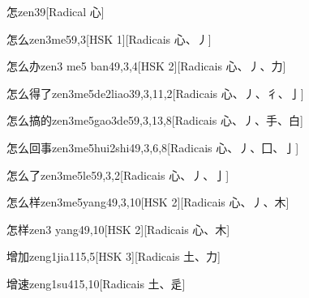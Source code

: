 \begin{entry}{怎}{zen3}{9}[Radical ⼼]
\end{entry}

\begin{entry}{怎么}{zen3me5}{9,3}[HSK 1][Radicais ⼼、⼃]
\end{entry}

\begin{entry}{怎么办}{zen3 me5 ban4}{9,3,4}[HSK 2][Radicais ⼼、⼃、⼒]
\end{entry}

\begin{entry}{怎么得了}{zen3me5de2liao3}{9,3,11,2}[Radicais ⼼、⼃、⼻、⼅]
\end{entry}

\begin{entry}{怎么搞的}{zen3me5gao3de5}{9,3,13,8}[Radicais ⼼、⼃、⼿、⽩]
\end{entry}

\begin{entry}{怎么回事}{zen3me5hui2shi4}{9,3,6,8}[Radicais ⼼、⼃、⼞、⼅]
\end{entry}

\begin{entry}{怎么了}{zen3me5le5}{9,3,2}[Radicais ⼼、⼃、⼅]
\end{entry}

\begin{entry}{怎么样}{zen3me5yang4}{9,3,10}[HSK 2][Radicais ⼼、⼃、⽊]
\end{entry}

\begin{entry}{怎样}{zen3 yang4}{9,10}[HSK 2][Radicais ⼼、⽊]
\end{entry}

\begin{entry}{增加}{zeng1jia1}{15,5}[HSK 3][Radicais ⼟、⼒]
\end{entry}

\begin{entry}{增速}{zeng1su4}{15,10}[Radicais ⼟、⾡]
\end{entry}

